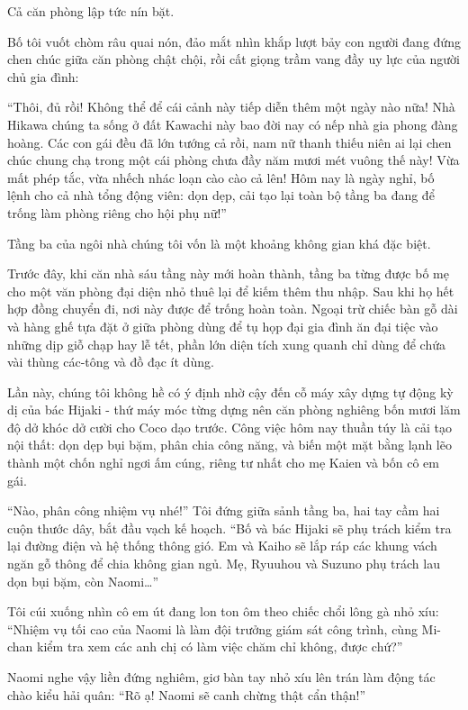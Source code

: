 ﻿\documentclass[../main.tex]{subfiles}
\begin{document}
Cả căn phòng lập tức nín bặt.

Bố tôi vuốt chòm râu quai nón, đảo mắt nhìn khắp lượt bảy con người đang đứng chen chúc giữa căn phòng chật chội, rồi cất giọng trầm vang đầy uy lực của người chủ gia đình:

``Thôi, đủ rồi! Không thể để cái cảnh này tiếp diễn thêm một ngày nào nữa! Nhà Hikawa chúng ta sống ở đất Kawachi này bao đời nay có nếp nhà gia phong đàng hoàng. Các con gái đều đã lớn tướng cả rồi, nam nữ thanh thiếu niên ai lại chen chúc chung chạ trong một cái phòng chưa đầy năm mươi mét vuông thế này! Vừa mất phép tắc, vừa nhếch nhác loạn cào cào cả lên! Hôm nay là ngày nghỉ, bố lệnh cho cả nhà tổng động viên: dọn dẹp, cải tạo lại toàn bộ tầng ba đang để trống làm phòng riêng cho hội phụ nữ!''

\ct

Tầng ba của ngôi nhà chúng tôi vốn là một khoảng không gian khá đặc biệt.

Trước đây, khi căn nhà sáu tầng này mới hoàn thành, tầng ba từng được bố mẹ cho một văn phòng đại diện nhỏ thuê lại để kiếm thêm thu nhập. Sau khi họ hết hợp đồng chuyển đi, nơi này được để trống hoàn toàn. Ngoại trừ chiếc bàn gỗ dài và hàng ghế tựa đặt ở giữa phòng dùng để tụ họp đại gia đình ăn đại tiệc vào những dịp giỗ chạp hay lễ tết, phần lớn diện tích xung quanh chỉ dùng để chứa vài thùng các-tông và đồ đạc ít dùng.

Lần này, chúng tôi không hề có ý định nhờ cậy đến cỗ máy xây dựng tự động kỳ dị của bác Hijaki - thứ máy móc từng dựng nên căn phòng nghiêng bốn mươi lăm độ dở khóc dở cười cho Coco dạo trước. Công việc hôm nay thuần túy là cải tạo nội thất: dọn dẹp bụi bặm, phân chia công năng, và biến một mặt bằng lạnh lẽo thành một chốn nghỉ ngơi ấm cúng, riêng tư nhất cho mẹ Kaien và bốn cô em gái.

``Nào, phân công nhiệm vụ nhé!'' Tôi đứng giữa sảnh tầng ba, hai tay cầm hai cuộn thước dây, bắt đầu vạch kế hoạch. ``Bố và bác Hijaki sẽ phụ trách kiểm tra lại đường điện và hệ thống thông gió. Em và Kaiho sẽ lắp ráp các khung vách ngăn gỗ thông để chia không gian ngủ. Mẹ, Ryuuhou và Suzuno phụ trách lau dọn bụi bặm, còn Naomi\dots''

Tôi cúi xuống nhìn cô em út đang lon ton ôm theo chiếc chổi lông gà nhỏ xíu: ``Nhiệm vụ tối cao của Naomi là làm đội trưởng giám sát công trình, cùng Mi-chan kiểm tra xem các anh chị có làm việc chăm chỉ không, được chứ?''

Naomi nghe vậy liền đứng nghiêm, giơ bàn tay nhỏ xíu lên trán làm động tác chào kiểu hải quân: ``Rõ ạ! Naomi sẽ canh chừng thật cẩn thận!''
\end{document}
